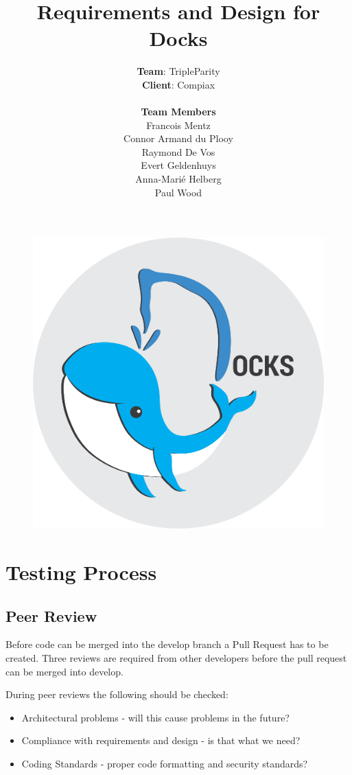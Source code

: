 \documentclass[]{article}
\title{\vspace{-1.0cm}Requirements and Design for Docks}
\author{\textbf{Team}: TripleParity\\
\textbf{Client}: Compiax\\
\\
\textbf{Team Members}\\
Francois Mentz\\
Connor Armand du Plooy\\
Raymond De Vos\\
Evert Geldenhuys\\
Anna-Marié Helberg\\
Paul Wood}
\date{}
\begin{document}
\begin{figure}[]
	\includegraphics[scale=0.7]{docks_round_512.png}
	\centering
\end{figure}

\maketitle

\tableofcontents
\pagebreak

\section{Testing Process}

\subsection{Peer Review}
Before code can be merged into the develop branch a Pull Request has to be created.
Three reviews are required from other developers before the pull request
can be merged into develop.

During peer reviews the following should be checked:
\begin{itemize}
	\item Architectural problems - will this cause problems in the future?
	\item Compliance with requirements and design - is that what we need?
	\item Coding Standards - proper code formatting and security standards?
\end{itemize}
\end{document}
